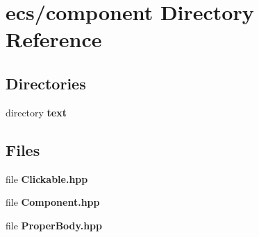 \section{ecs/component Directory Reference}
\label{dir_56c75c111b4c8ebeb3353458263177f2}
\subsection*{Directories}
\begin{DoxyCompactItemize}
\item 
directory \textbf{ text}
\end{DoxyCompactItemize}
\subsection*{Files}
\begin{DoxyCompactItemize}
\item 
file \textbf{ Clickable.\+hpp}
\item 
file \textbf{ Component.\+hpp}
\item 
file \textbf{ Proper\+Body.\+hpp}
\end{DoxyCompactItemize}
